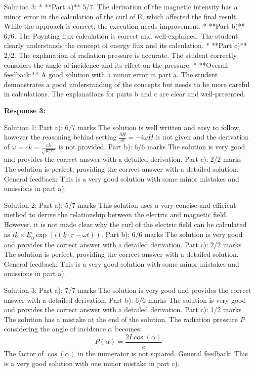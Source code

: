 \documentclass[a4paper,11pt]{article}
\begin{document}
Solution 3:
* **Part a)** 5/7. The derivation of the magnetic intensity has a minor error in the calculation of the curl of E, which affected the final result. While the approach is correct, the execution needs improvement.
* **Part b)** 6/6. The Poynting flux calculation is correct and well-explained. The student clearly understands the concept of energy flux and its calculation.
* **Part c)** 2/2. The explanation of radiation pressure is accurate. The student correctly considers the angle of incidence and its effect on the pressure.
* **Overall feedback:** A good solution with a minor error in part a. The student demonstrates a good understanding of the concepts but needs to be more careful in calculations. The explanations for parts b and c are clear and well-presented.

\bigskip    
\textbf{Response 3:}

Solution 1:
Part a): 6/7 marks
The solution is well written and easy to follow, however the reasoning behind setting \(\frac{\partial \underline{H}}{\partial t} = -i\omega \underline{H}\) is not given and the derivation of \(\omega = ck = \frac{ck}{\sqrt{\mu_{0}\epsilon_{0}}}\) is not provided. 
Part b): 6/6 marks 
The solution is very good and provides the correct answer with a detailed derivation.
Part c): 2/2 marks
The solution is perfect, providing the correct answer with a detailed solution. 
General feedback: This is a very good solution with some minor mistakes and omissions in part a). 

Solution 2:
Part a): 5/7 marks
This solution uses a very concise and efficient method to derive the relationship between the electric and magnetic field. However, it is not made clear why the curl of the electric field can be calculated as \(i\underline{k} \times \underline{E}_{0} \exp(i(\underline{k} \cdot \underline{r} - \omega t))\). 
Part b): 6/6 marks
The solution is very good and provides the correct answer with a detailed derivation.
Part c): 2/2 marks
The solution is perfect, providing the correct answer with a detailed solution. 
General feedback: This is a very good solution with some minor mistakes and omissions in part a). 

Solution 3:
Part a): 7/7 marks
The solution is very good and provides the correct answer with a detailed derivation.
Part b): 6/6 marks
The solution is very good and provides the correct answer with a detailed derivation.
Part c): 1/2 marks
The solution has a mistake at the end of the solution.  The radiation pressure \( P\) considering the angle of incidence \(\alpha\) becomes:
\[
P(\alpha) = \frac{2I\cos(\alpha)}{c}
\]
The factor of \( \cos(\alpha) \) in the numerator is not squared. 
General feedback: This is a very good solution with one minor mistake in part c). 
\end{document}
